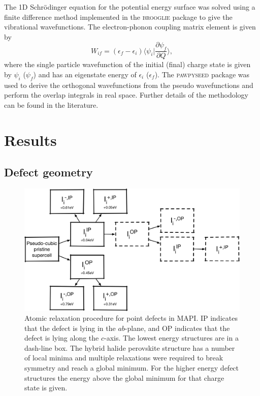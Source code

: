 The 1D Schr\"{o}dinger equation for the potential energy surface was solved using a finite difference method implemented in the \textsc{brooglie} package\autocite{brooglie} to give the vibrational wavefunctions. 
The electron-phonon coupling matrix element is given by
\begin{equation} \label{epcouplingterm}
    W_{if} = (\epsilon_f-\epsilon_i)\langle\psi_i|\frac{\partial\psi_f}{\partial Q}\rangle,
\end{equation}
where the single particle wavefunction of the initial (final) charge state is given by $\psi_i$ ($\psi_f$) and has an eigenstate energy of $\epsilon_i$ ($\epsilon_f$). The \textsc{pawpyseed} package\autocite{pawpyseed} was used to derive the orthogonal wavefunctions from the  pseudo wavefunctions and perform the overlap integrals in real space.
Further details of  the  methodology  can  be  found  in  the  literature.\autocite{Alkauskas2014} 

\section{Results} \label{ch:6-results}

\subsection{Defect geometry}

\begin{figure}[h!]
\centering
  \includegraphics[width=0.7\columnwidth]{figures/ch6/relaxation_workflow.png}
  \caption[Atomic relaxation procedure for point defects in MAPI]{Atomic relaxation procedure for point defects in MAPI. IP indicates that the defect is lying in the $ab$-plane, and OP indicates that the defect is lying along the $c$-axis. The lowest energy structures are in a dash-line box. The hybrid halide perovskite structure has a number of local minima and multiple relaxations were required to break symmetry and reach a global minimum. For the higher energy defect structures the energy above the global minimum for that charge state is given.}
\label{relaxation_workflow}
\end{figure}


